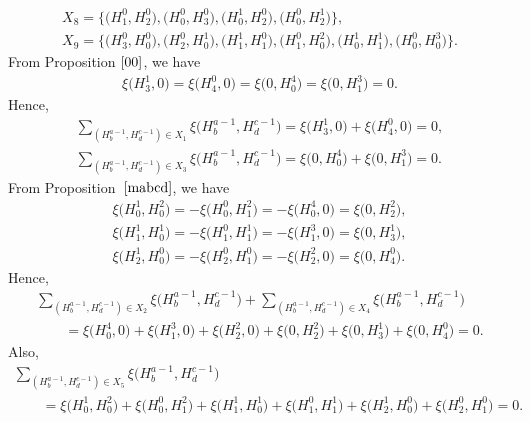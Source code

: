 \documentclass[pdftex]{sigma}
\numberwithin{equation}{section}
\begin{document}
\begin{Example}
\begin{gather*}
X_8=\bigl\{\bigl(H^{0}_{1},H^{0}_{2}\bigr),\bigl(H^{0}_{0},H^{0}_{3}\bigr),\bigl(H^{1}_{0},H^{0}_{2}\bigr),\bigl(H^{0}_{0},H^{1}_{2}\bigr)\bigr\},\\
X_9=\bigl\{\bigl(H^{0}_{3},H^{0}_{0}\bigr),\bigl(H^{0}_{2},H^{1}_{0}\bigr),\bigl(H^{1}_{1},H^{0}_{1}\bigr),\bigl(H^{0}_{1},H^{2}_{0}\bigr),\bigl(H^{1}_{0},H^{1}_{1}\bigr),\bigl(H^{0}_{0},H^{3}_{0}\bigr)\bigr\}.
\end{gather*}
From {\rm Proposition} $\ref{00}$, we have
\begin{gather*}
\xi\bigl(H^{1}_{3},0\bigr)=\xi\bigl(H^{0}_{4},0\bigr)=\xi\bigl(0,H^{4}_{0}\bigr)=\xi\bigl(0,H^{3}_{1}\bigr)=0.
\end{gather*}
Hence,
\begin{gather*}
\sum_{(H^{a-1}_{b},H^{c-1}_{d})\in X_1}\xi\bigl(H^{a-1}_{b},H^{c-1}_{d}\bigr)=\xi\bigl(H^{1}_{3},0\bigr)+\xi\bigl(H^{0}_{4},0\bigr)=0,
\\
\sum_{(H^{a-1}_{b},H^{c-1}_{d})\in X_3}\xi\bigl(H^{a-1}_{b},H^{c-1}_{d}\bigr)=\xi\bigl(0,H^{4}_{0}\bigr)+\xi\bigl(0,H^{3}_{1}\bigr)=0.
\end{gather*}
From {\rm Proposition}\ $\ref{mabcd}$, we have
\begin{gather*}
\xi\bigl(H^{1}_{0},H^{2}_{0}\bigr)=-\xi\bigl(H^{0}_{0},H^{2}_{1}\bigr)=-\xi\bigl(H^{4}_{0},0\bigr)=\xi\bigl(0,H^{2}_{2}\bigr),\\%
\xi\bigl(H^{1}_{1},H^{1}_{0}\bigr)=-\xi\bigl(H^{0}_{1},H^{1}_{1}\bigr)=-\xi\bigl(H^{3}_{1},0\bigr)=\xi\bigl(0,H^{1}_{3}\bigr),\\%
\xi\bigl(H^{1}_{2},H^{0}_{0}\bigr)=-\xi\bigl(H^{0}_{2},H^{0}_{1}\bigr)=-\xi\bigl(H^{2}_{2},0\bigr)=\xi\bigl(0,H^{0}_{4}\bigr).%
\end{gather*}
Hence,
\begin{gather*}
\sum_{(H^{a-1}_{b},H^{c-1}_{d})\in X_2}\xi\bigl(H^{a-1}_{b},H^{c-1}_{d}\bigr)+\sum_{(H^{a-1}_{b},H^{c-1}_{d})\in X_4}\xi\bigl(H^{a-1}_{b},H^{c-1}_{d}\bigr)\\
\qquad{}=\xi\bigl(H^{4}_{0},0\bigr)+\xi\bigl(H^{3}_{1},0\bigr)+\xi\bigl(H^{2}_{2},0\bigr)+\xi\bigl(0,H^{2}_{2}\bigr)+\xi\bigl(0,H^{1}_{3}\bigr)+\xi\bigl(0,H^{0}_{4}\bigr)=0.
\end{gather*}
Also,
\begin{gather*}
\sum_{(H^{a-1}_{b},H^{c-1}_{d})\in X_5}\xi\bigl(H^{a-1}_{b},H^{c-1}_{d}\bigr)\\
\qquad{}=\xi\bigl(H^{1}_{0},H^{2}_{0}\bigr)+\xi\bigl(H^{0}_{0},H^{2}_{1}\bigr)+\xi\bigl(H^{1}_{1},H^{1}_{0}\bigr)+\xi\bigl(H^{0}_{1},H^{1}_{1}\bigr)+\xi\bigl(H^{1}_{2},H^{0}_{0}\bigr)+\xi\bigl(H^{0}_{2},H^{0}_{1}\bigr)=0.

\end{gather*}
\end{Example}
\end{document}
